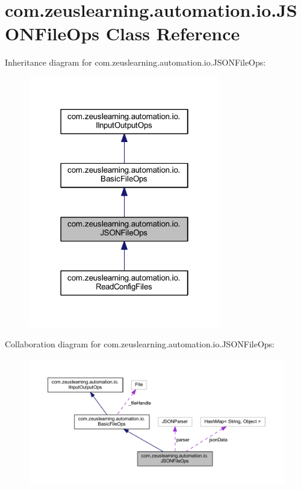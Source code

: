 \hypertarget{classcom_1_1zeuslearning_1_1automation_1_1io_1_1JSONFileOps}{}\section{com.\+zeuslearning.\+automation.\+io.\+J\+S\+O\+N\+File\+Ops Class Reference}
\label{classcom_1_1zeuslearning_1_1automation_1_1io_1_1JSONFileOps}


Inheritance diagram for com.\+zeuslearning.\+automation.\+io.\+J\+S\+O\+N\+File\+Ops\+:\nopagebreak
\begin{figure}[H]
\begin{center}
\leavevmode
\includegraphics[width=238pt]{dd/d9d/classcom_1_1zeuslearning_1_1automation_1_1io_1_1JSONFileOps__inherit__graph}
\end{center}
\end{figure}


Collaboration diagram for com.\+zeuslearning.\+automation.\+io.\+J\+S\+O\+N\+File\+Ops\+:\nopagebreak
\begin{figure}[H]
\begin{center}
\leavevmode
\includegraphics[width=350pt]{d1/d57/classcom_1_1zeuslearning_1_1automation_1_1io_1_1JSONFileOps__coll__graph}
\end{center}
\end{figure}
